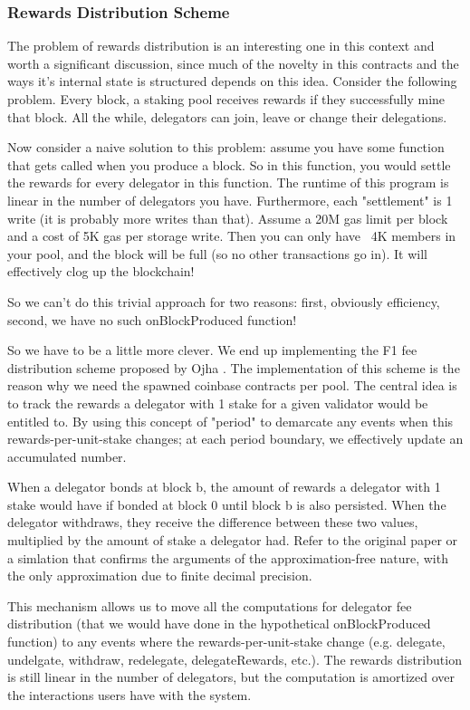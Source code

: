 \subsubsection{Rewards Distribution Scheme} \label{f1-rewards}
The problem of rewards distribution is an interesting one in this context and worth a significant discussion, since much of the novelty in this contracts and the ways it's internal state is structured depends on this idea. Consider the following problem. Every block, a staking pool receives rewards if they successfully mine that block. All the while, delegators can join, leave or change their delegations. 

Now consider a naive solution to this problem: assume you have some function that gets called when you produce a block. So in this function, you would settle the rewards for every delegator in this function. The runtime of this program is linear in the number of delegators you have. Furthermore, each "settlement" is 1 write (it is probably more writes than that). Assume a 20M gas limit per block and a cost of 5K gas per storage write. Then you can only have ~4K members in your pool, and the block will be full (so no other transactions go in). It will effectively clog up the blockchain! 

So we can't do this trivial approach for two reasons: first, obviously efficiency, second, we have no such onBlockProduced function! 

So we have to be a little more clever. We end up implementing the F1 fee distribution scheme proposed by Ojha \cite{Ojh19}. The implementation of this scheme is the reason why we need the spawned coinbase contracts per pool. The central idea is to track the rewards a delegator with 1 stake for a given validator would be entitled to. By using this concept of "period" to demarcate any events when this rewards-per-unit-stake changes; at each period boundary, we effectively update an accumulated number. 

When a delegator bonds at block b, the amount of rewards a delegator with 1 stake would have if bonded at block 0 until block b is also persisted. When the delegator withdraws, they receive the difference between these two values, multiplied by the amount of stake a delegator had. Refer to the original paper \cite{Ojh19} or a simlation \cite{Sha19} that confirms the arguments of the approximation-free nature, with the only approximation due to finite decimal precision.  

This mechanism allows us to move all the computations for delegator fee distribution (that we would have done in the hypothetical onBlockProduced function) to any events where the rewards-per-unit-stake change (e.g. delegate, undelgate, withdraw, redelegate, delegateRewards, etc.). The rewards distribution is still linear in the number of delegators, but the computation is amortized over the interactions users have with the system. 

